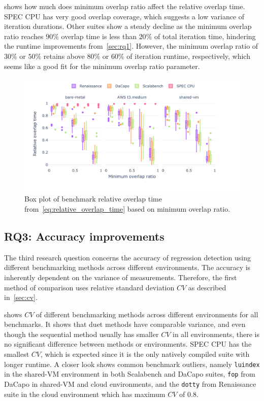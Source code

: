  shows how much does minimum overlap ratio affect the relative overlap time.
SPEC CPU has very good overlap coverage, which suggests a low variance of iteration durations.
Other suites show a steady decline as the minimum overlap ratio reaches $90\%$ overlap time is less than $20\%$ of total iteration time, hindering the runtime improvements from~\cref{sec:rq1}.
However, the minimum overlap ratio of $30\%$ or $50\%$ retains above $80\%$ or $60\%$ of iteration runtime, respectively, which seems like a good fit for the minimum overlap ratio parameter.

\begin{figure}
	\centering
	\includegraphics[width=1\linewidth]{./figures/relative_overlap_time.pdf}
	\caption{
		Box plot of benchmark relative overlap time from~\cref{eq:relative_overlap_time} based on minimum overlap ratio.
	}
	\label{fig:relative_overlap_time}
\end{figure}

\subsection{RQ3: Accuracy improvements}
\label{sec:rq3}

The third research question concerns the accuracy of regression detection using different benchmarking methods across different environments.
The accuracy is inherently dependent on the variance of measurements.
Therefore, the first method of comparison uses relative standard deviation $CV$ as described in~\cref{sec:cv}.

 shows $CV$ of different benchmarking methods across different environments for all benchmarks.
It shows that duet methods have comparable variance, and even though the sequential method usually has smaller $CV$ in all environments, there is no significant difference between methods or environments.
SPEC CPU has the smallest $CV$, which is expected since it is the only natively compiled suite with longer runtime.
A closer look shows common benchmark outliers, namely \lstinline{luindex} in the \mbox{shared-VM} environment in both Scalabench and DaCapo suites, \lstinline{fop} from DaCapo in \mbox{shared-VM} and cloud environments, and the \lstinline{dotty} from Renaissance suite in the cloud environment which has maximum $CV$ of $0.8$.

